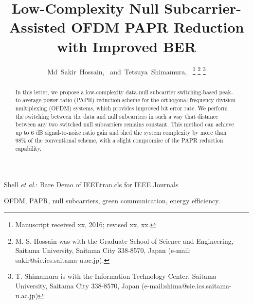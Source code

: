\documentclass[journal,comsoc]{IEEEtran}
\begin{document}
\title{Low-Complexity Null Subcarrier-Assisted OFDM PAPR Reduction with Improved BER}


\author{Md~Sakir~Hossain,~
        and~Tetsuya~Shimamura,~%
\thanks{Manuscript received xx, 2016; revised xx, xx.}
\thanks{M. S. Hossain was with the Graduate School of Science and Engineering,  Saitama University, Saitama City 338-8570, Japan
 (e-mail: sakir@sie.ics.saitama-u.ac.jp).}%
\thanks{T. Shimamura is with the Information Technology Center, Saitama University, Saitama City 338-8570, Japan (e-mail:shima@sie.ics.saitama-u.ac.jp)}%
}




%
{Shell \MakeLowercase{\textit{et al.}}: Bare Demo of IEEEtran.cls for IEEE Journals}


\maketitle

\begin{abstract}
In this letter, we propose a low-complexity data-null subcarrier switching-based peak-to-average power ratio (PAPR) reduction scheme for the orthogonal frequency division multiplexing (OFDM) systems, which provides improved bit error rate. We perform the switching between the data and null subcarriers in such a way that distance between any two switched null subcarriers remains constant. This method can achieve up to 6 dB signal-to-noise ratio gain and shed the system complexity by more than 98\% of the conventional scheme, with a slight compromise of the PAPR reduction capability.
\end{abstract}

\begin{IEEEkeywords}
OFDM, PAPR, null subcarriers, green communication, energy efficiency.
\end{IEEEkeywords}

\IEEEpeerreviewmaketitle
\end{document}
